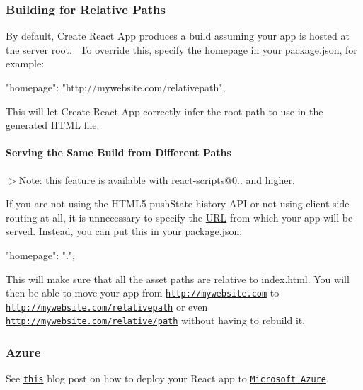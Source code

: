 \subsubsection*{Building for Relative Paths}

By default, Create React App produces a build assuming your app is hosted at the server root.~\newline
 To override this, specify the {\ttfamily homepage} in your {\ttfamily package.\+json}, for example\+:


\begin{DoxyCode}
"homepage": "http://mywebsite.com/relativepath",
\end{DoxyCode}


This will let Create React App correctly infer the root path to use in the generated H\+T\+ML file.

\paragraph*{Serving the Same Build from Different Paths}

$>$Note\+: this feature is available with {\ttfamily react-\/scripts@0..} and higher.

If you are not using the H\+T\+M\+L5 {\ttfamily push\+State} history A\+PI or not using client-\/side routing at all, it is unnecessary to specify the \mbox{\hyperlink{namespace_u_r_l}{U\+RL}} from which your app will be served. Instead, you can put this in your {\ttfamily package.\+json}\+:


\begin{DoxyCode}
"homepage": ".",
\end{DoxyCode}


This will make sure that all the asset paths are relative to {\ttfamily index.\+html}. You will then be able to move your app from {\ttfamily \href{http://mywebsite.com}{\tt http\+://mywebsite.\+com}} to {\ttfamily \href{http://mywebsite.com/relativepath}{\tt http\+://mywebsite.\+com/relativepath}} or even {\ttfamily \href{http://mywebsite.com/relative/path}{\tt http\+://mywebsite.\+com/relative/path}} without having to rebuild it.

\subsubsection*{Azure}

See \href{https://medium.com/@to_pe/deploying-create-react-app-on-microsoft-azure-c0f6686a4321}{\tt this} blog post on how to deploy your React app to \href{https://azure.microsoft.com/}{\tt Microsoft Azure}.

